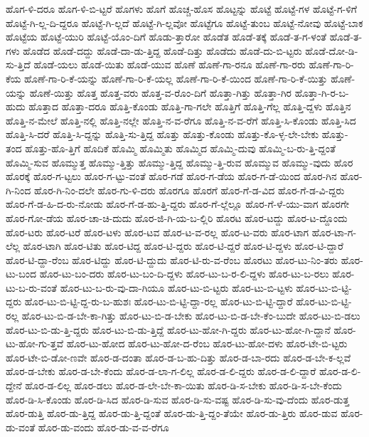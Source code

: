 {ಹೊಗ-ಳಿ-ದರೂ
ಹೊಗ-ಳಿ-ಬಿ-ಟ್ಟರೆ
ಹೊಗಳು
ಹೊಗೆ
ಹೊಚ್ಚ-ಹೊಸ
ಹೊಟ್ಟನ್ನು
ಹೊಟ್ಟೆ
ಹೊಟ್ಟೆ-ಗಳ
ಹೊಟ್ಟೆ-ಗ-ಳಿಗೆ
ಹೊಟ್ಟೆ-ಗಿ-ಲ್ಲ-ದಿ-ದ್ದರೂ
ಹೊಟ್ಟೆ-ಗಿ-ಲ್ಲದೆ
ಹೊಟ್ಟೆ-ಗಿ-ಲ್ಲವೋ
ಹೊಟ್ಟೆಗೂ
ಹೊಟ್ಟೆ-ತುಂಬ
ಹೊಟ್ಟೆ-ನೋವು
ಹೊಟ್ಟೆ-ಬಾಕ
ಹೊಟ್ಟೆಯ
ಹೊಟ್ಟೆ-ಯುರಿ
ಹೊಟ್ಟೆ-ಯೊಂ-ದಿಗೆ
ಹೊಡು-ತ್ತಾರೋ
ಹೊಡೆತ
ಹೊಡೆ-ತಕ್ಕೆ
ಹೊಡೆ-ತ-ಗ-ಳಂತೆ
ಹೊಡೆ-ತ-ಗಳು
ಹೊಡೆದ
ಹೊಡೆ-ದದ್ದು
ಹೊಡೆ-ದಾ-ಡು-ತ್ತಿದ್ದ
ಹೊಡೆ-ದಿತ್ತು
ಹೊಡೆದು
ಹೊಡೆ-ದು-ಬಿ-ಟ್ಟರು
ಹೊಡೆ-ದೋ-ಡಿ-ಸು-ತ್ತಿದೆ
ಹೊಡೆ-ಯಲು
ಹೊಡೆ-ಯಿತು
ಹೊಡೆ-ಯುವ
ಹೊಣೆ
ಹೊಣೆ-ಗಾ-ರನೂ
ಹೊಣೆ-ಗಾ-ರರು
ಹೊಣೆ-ಗಾ-ರಿ-ಕೆಯ
ಹೊಣೆ-ಗಾ-ರಿ-ಕೆ-ಯನ್ನು
ಹೊಣೆ-ಗಾ-ರಿ-ಕೆ-ಯಲ್ಲ
ಹೊಣೆ-ಗಾ-ರಿ-ಕೆ-ಯಿಂದ
ಹೊಣೆ-ಗಾ-ರಿ-ಕೆ-ಯಿತ್ತು
ಹೊಣೆ-ಯನ್ನು
ಹೊಣೆ-ಯಿತ್ತು
ಹೊತ್ತ
ಹೊತ್ತ-ವರು
ಹೊತ್ತ-ವ-ರೊಂ-ದಿಗೆ
ಹೊತ್ತಾ-ಗಿತ್ತು
ಹೊತ್ತಾ-ಗಿರ
ಹೊತ್ತಾ-ಗಿ-ರ-ಬ-ಹುದು
ಹೊತ್ತಾದ
ಹೊತ್ತಾ-ದರೂ
ಹೊತ್ತಿ-ಕೊಂಡು
ಹೊತ್ತಿ-ಗಾ-ಗಲೇ
ಹೊತ್ತಿಗೆ
ಹೊತ್ತಿ-ಗೆಲ್ಲ
ಹೊತ್ತಿ-ದ್ದಳು
ಹೊತ್ತಿನ
ಹೊತ್ತಿ-ನ-ಮೇಲೆ
ಹೊತ್ತಿ-ನಲ್ಲಿ
ಹೊತ್ತಿ-ನಲ್ಲೇ
ಹೊತ್ತಿ-ನ-ವ-ರೆಗೂ
ಹೊತ್ತಿ-ನ-ವ-ರೆಗೆ
ಹೊತ್ತಿ-ಸಿ-ಕೊಂಡು
ಹೊತ್ತಿ-ಸಿದ
ಹೊತ್ತಿ-ಸಿ-ದರೆ
ಹೊತ್ತಿ-ಸಿ-ದ್ದನ್ನು
ಹೊತ್ತಿ-ಸು-ತ್ತಿದ್ದ
ಹೊತ್ತು
ಹೊತ್ತು-ಕೊಂಡು
ಹೊತ್ತು-ಕೊ-ಳ್ಳ-ಲೇ-ಬೇಕು
ಹೊತ್ತು-ತಂದ
ಹೊತ್ತು-ಹೊ-ತ್ತಿಗೆ
ಹೊದಿಕೆ
ಹೊಮ್ಮಿ
ಹೊಮ್ಮಿತು
ಹೊಮ್ಮಿದ
ಹೊಮ್ಮಿ-ದುವು
ಹೊಮ್ಮಿ-ಬ-ರು-ತ್ತಿ-ದ್ದಂತೆ
ಹೊಮ್ಮಿ-ಸುವ
ಹೊಮ್ಮುತ್ತ
ಹೊಮ್ಮು-ತ್ತಿತ್ತು
ಹೊಮ್ಮು-ತ್ತಿದ್ದ
ಹೊಮ್ಮು-ತ್ತಿ-ರುವ
ಹೊಮ್ಮುವ
ಹೊಮ್ಮು-ವುದು
ಹೊರ
ಹೊರಕ್ಕೆ
ಹೊರ-ಗ-ಟ್ಟಲು
ಹೊರ-ಗ-ಟ್ಟು-ವಂತೆ
ಹೊರ-ಗಡೆ
ಹೊರ-ಗ-ಡೆಯ
ಹೊರ-ಗ-ಡೆ-ಯಿಂದ
ಹೊರ-ಗಿನ
ಹೊರ-ಗಿ-ನಿಂದ
ಹೊರ-ಗಿ-ನಿಂ-ದಲೇ
ಹೊರ-ಗು-ಳಿ-ದರು
ಹೊರಗೂ
ಹೊರಗೆ
ಹೊರ-ಗೆ-ಡ-ವಿದ
ಹೊರ-ಗೆ-ಡ-ವಿ-ದ್ದರು
ಹೊರ-ಗೆ-ಡ-ಹಿ-ದ-ರು-ನೋಡು
ಹೊರ-ಗೆ-ಡ-ಹು-ತ್ತಿ-ದ್ದರು
ಹೊರ-ಗೆ-ಲ್ಲೆಲ್ಲೂ
ಹೊರ-ಗೆ-ಳೆ-ಯು-ವಾಗ
ಹೊರಗೇ
ಹೊರ-ಗೋ-ಡೆಯ
ಹೊರ-ಚಾ-ಚಿ-ದುದು
ಹೊರ-ಜಿ-ಗಿ-ಯ-ಬ-ಲ್ಲಿರಿ
ಹೊರಟ
ಹೊರ-ಟದ್ದು
ಹೊರ-ಟ-ದ್ದೊಂದು
ಹೊರ-ಟರು
ಹೊರ-ಟರೆ
ಹೊರ-ಟಳು
ಹೊರ-ಟವ
ಹೊರ-ಟ-ವ-ರಲ್ಲ
ಹೊರ-ಟ-ವರು
ಹೊರ-ಟಾಗ
ಹೊರ-ಟಾ-ಗ-ಲೆಲ್ಲ
ಹೊರ-ಟಾಗಿ
ಹೊರ-ಟಿತು
ಹೊರ-ಟಿದ್ದ
ಹೊರ-ಟಿ-ದ್ದರು
ಹೊರ-ಟಿ-ದ್ದರೆ
ಹೊರ-ಟಿ-ದ್ದಳು
ಹೊರ-ಟಿ-ದ್ದಾರೆ
ಹೊರ-ಟಿ-ದ್ದಾ-ರೆಂಬ
ಹೊರ-ಟಿದ್ದು
ಹೊರ-ಟಿ-ದ್ದುದು
ಹೊರ-ಟಿ-ರು-ವ-ರೆಂಬ
ಹೊರಟು
ಹೊರ-ಟು-ನಿಂ-ತರು
ಹೊರ-ಟು-ಬಂದ
ಹೊರ-ಟು-ಬಂ-ದರು
ಹೊರ-ಟು-ಬಂ-ದಿ-ದ್ದಳು
ಹೊರ-ಟು-ಬ-ರ-ಲಿ-ದ್ದಳು
ಹೊರ-ಟು-ಬ-ರಲು
ಹೊರ-ಟು-ಬ-ರು-ವಂತೆ
ಹೊರ-ಟು-ಬ-ರು-ವು-ದಾ-ಗಿಯೂ
ಹೊರ-ಟು-ಬಿ-ಟ್ಟರು
ಹೊರ-ಟು-ಬಿ-ಟ್ಟಳು
ಹೊರ-ಟು-ಬಿ-ಟ್ಟಿ-ದ್ದರು
ಹೊರ-ಟು-ಬಿ-ಟ್ಟಿ-ದ್ದ-ರು-ಬ-ಹುಶಃ
ಹೊರ-ಟು-ಬಿ-ಟ್ಟಿ-ದ್ದಾ-ರಲ್ಲ
ಹೊರ-ಟು-ಬಿ-ಟ್ಟಿ-ದ್ದಾರೆ
ಹೊರ-ಟು-ಬಿ-ಟ್ಟಿ-ರಲ್ಲ
ಹೊರ-ಟು-ಬಿ-ಡ-ಬೇ-ಕಾ-ಗಿತ್ತು
ಹೊರ-ಟು-ಬಿ-ಡ-ಬೇಕು
ಹೊರ-ಟು-ಬಿ-ಡ-ಬೇ-ಕೆಂ-ಬುದೇ
ಹೊರ-ಟು-ಬಿ-ಡಲು
ಹೊರ-ಟು-ಬಿ-ಡು-ತ್ತಿ-ದ್ದರು
ಹೊರ-ಟು-ಬಿ-ಡು-ತ್ತಿದ್ದೆ
ಹೊರ-ಟು-ಹೋ-ಗಿ-ದ್ದರು
ಹೊರ-ಟು-ಹೋ-ಗಿ-ದ್ದಾನೆ
ಹೊರ-ಟು-ಹೋ-ಗು-ತ್ತವೆ
ಹೊರ-ಟು-ಹೋದ
ಹೊರ-ಟು-ಹೋ-ದ-ರೆಂಬ
ಹೊರ-ಟು-ಹೋ-ದಳು
ಹೊರ-ಟೇ-ಬಿ-ಟ್ಟರು
ಹೊರ-ಟೇ-ಬಿ-ಡೋ-ಣವೇ
ಹೊರ-ಡ-ದಂತಾ
ಹೊರ-ಡ-ಬ-ಹು-ದಿತ್ತು
ಹೊರ-ಡ-ಬಾ-ರದು
ಹೊರ-ಡ-ಬೇ-ಕ-ಲ್ಲವೆ
ಹೊರ-ಡ-ಬೇಕು
ಹೊರ-ಡ-ಬೇ-ಕೆಂದು
ಹೊರ-ಡ-ಲಾ-ಗ-ಲಿಲ್ಲ
ಹೊರ-ಡ-ಲಿ-ದ್ದರು
ಹೊರ-ಡ-ಲಿ-ದ್ದಾರೆ
ಹೊರ-ಡ-ಲಿ-ದ್ದೇನೆ
ಹೊರ-ಡ-ಲಿಲ್ಲ
ಹೊರ-ಡಲು
ಹೊರ-ಡ-ಲೇ-ಬೇ-ಕಾ-ಯಿತು
ಹೊರ-ಡಿ-ಸ-ಬೇಕು
ಹೊರ-ಡಿ-ಸ-ಬೇ-ಕೆಂದು
ಹೊರ-ಡಿ-ಸಿ-ಕೊಂಡು
ಹೊರ-ಡಿ-ಸಿದ
ಹೊರ-ಡಿ-ಸುವ
ಹೊರ-ಡಿ-ಸು-ವಷ್ಟ
ಹೊರ-ಡಿ-ಸು-ವು-ದೆಂದು
ಹೊರ-ಡುತ್ತ
ಹೊರ-ಡುತ್ತಿ
ಹೊರ-ಡು-ತ್ತಿದ್ದ
ಹೊರ-ಡು-ತ್ತಿ-ದ್ದಂತೆ
ಹೊರ-ಡು-ತ್ತಿ-ದ್ದಂ-ತೆಯೇ
ಹೊರ-ಡು-ತ್ತಿರು
ಹೊರ-ಡುವ
ಹೊರ-ಡು-ವಂತೆ
ಹೊರ-ಡು-ವಂದು
ಹೊರ-ಡು-ವ-ವ-ರೆಗೂ
}
